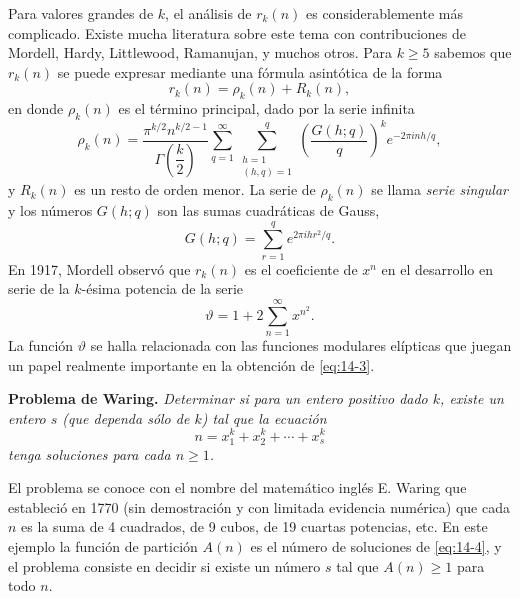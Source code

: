     Para valores grandes de $k$, el análisis de $r_k(n)$ es considerablemente más complicado.
    Existe mucha literatura sobre este tema con contribuciones de Mordell, Hardy, Littlewood,
    Ramanujan, y muchos otros. Para $k\geq5$ sabemos que $r_k(n)$ se puede expresar mediante
    una fórmula asintótica de la forma
    \begin{equation}\label{eq:14-3}
        r_k(n)=\rho_k(n)+R_k(n),
    \end{equation}
    en donde $\rho_k(n)$ es el término principal, dado por la serie infinita
    \begin{equation*}
        \rho_k(n)=\frac{\pi^{k/2}n^{k/2-1}}{\Gamma\left(\dfrac{k}{2}\right)}\sum_{q=1}^{\infty}\sum_{\substack{h=1\\(h,q)=1}}^{q}\left(\frac{G(h;q)}{q}\right)^ke^{-2\pi inh/q},
    \end{equation*}
    y $R_k(n)$ es un resto de orden menor. La serie de $\rho_k(n)$ se llama \textit{serie
    singular} y los números $G(h;q)$ son las sumas cuadráticas de Gauss,
    \begin{equation*}
        G(h;q)=\sum_{r=1}^{q}e^{2\pi ihr^2/q}.
    \end{equation*}
    En 1917, Mordell observó que $r_k(n)$ es el coeficiente de $x^n$ en el desarrollo en serie
    de la $k$-ésima potencia de la serie
    \begin{equation*}
        \vartheta=1+2\sum_{n=1}^{\infty}x^{n^2}.
    \end{equation*}
    La función $\vartheta$ se halla relacionada con las funciones modulares elípticas que juegan
    un papel realmente importante en la obtención de \eqref{eq:14-3}.

    \textbf{Problema de Waring.} \textit{Determinar si para un entero positivo dado $k$, existe
    un entero $s$ (que dependa sólo de $k$) tal que la ecuación}
    \begin{equation}\label{eq:14-4}
        n=x_1^k+x_2^k+\cdots+x_s^k
    \end{equation}
    \textit{tenga soluciones para cada $n\geq1$.}

    El problema se conoce con el nombre del matemático inglés E. Waring que estableció en 1770
    (sin demostración y con limitada evidencia numérica) que cada $n$ es la suma de 4
    cuadrados, de 9 cubos, de 19 cuartas potencias, etc. En este ejemplo la función de partición
    $A(n)$ es el número de soluciones de \eqref{eq:14-4}, y el problema consiste en decidir si
    existe un número $s$ tal que $A(n)\geq1$ para todo $n$.

